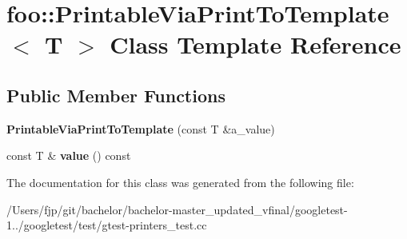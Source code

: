 \hypertarget{classfoo_1_1_printable_via_print_to_template}{}\section{foo\+:\+:Printable\+Via\+Print\+To\+Template$<$ T $>$ Class Template Reference}
\label{classfoo_1_1_printable_via_print_to_template}
\subsection*{Public Member Functions}
\begin{DoxyCompactItemize}
\item 
\mbox{\label{classfoo_1_1_printable_via_print_to_template_a8fef9e8b59c9415624230b73469b517e}} 
{\bfseries Printable\+Via\+Print\+To\+Template} (const T \&a\+\_\+value)
\item 
\mbox{\label{classfoo_1_1_printable_via_print_to_template_a14e0fcac9ae264e37e6212994b2920f6}} 
const T \& {\bfseries value} () const
\end{DoxyCompactItemize}


The documentation for this class was generated from the following file\+:\begin{DoxyCompactItemize}
\item 
/\+Users/fjp/git/bachelor/bachelor-\/master\+\_\+updated\+\_\+vfinal/googletest-\/1../googletest/test/gtest-\/printers\+\_\+test.\+cc\end{DoxyCompactItemize}
